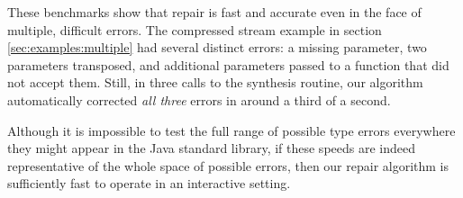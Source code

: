 These benchmarks show that repair is fast and accurate even in the face of multiple, difficult errors. The compressed stream example in section \ref{sec:examples:multiple} had several distinct errors: a missing parameter, two parameters transposed, and additional parameters passed to a function that did not accept them. Still, in three calls to the synthesis routine, our algorithm automatically corrected \textit{all three} errors in around a third of a second.

Although it is impossible to test the full range of possible type errors everywhere they might appear in the Java standard library, if these speeds are indeed representative of the whole space of possible errors, then our repair algorithm is sufficiently fast to operate in an interactive setting.
